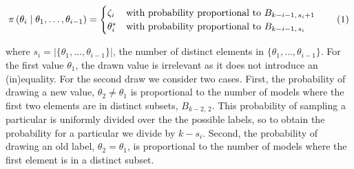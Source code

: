 \documentclass[11pt,a4paper]{article}
\theoremstyle{definition} %
\theoremstyle{case}
\newcommand{\prior}[1]{\pi\left({#1}\right)}
\newcommand{\rbellnum}[2]{B_{#1,\,#2}}
\newcommand{\setsize}[1]{|{#1}|}
\newcommand{\numberthis}{\addtocounter{equation}{1}\tag{\theequation}}
\begin{document}

\begin{equation}
    \prior{\theta_i \mid \theta_1, \ldots, \theta_{i - 1}} = \begin{cases}
    \zeta_i & \text{with probability proportional to } \rbellnum{k - i - 1}{s_i + 1} \\
    \theta_i^\ast & \text{with probability proportional to }  \rbellnum{k - i - 1}{s_i} \enspace
    \end{cases} \numberthis
\end{equation}


where $s_i = \setsize{\{\theta_1, \ldots, \theta_{i - 1}\}}$, the number of distinct elements in $\{\theta_1, \ldots, \theta_{i - 1}\}$. For the first value $\theta_1$, the drawn value is irrelevant as it does not introduce an (in)equality. For the second draw we consider two cases. First, the probability of drawing a new value, $\theta_2 \neq \theta_1$ is proportional to the number of models where the first two elements are in distinct subsets, $\rbellnum{k - 2}{2}$. This probability of sampling a particular  is uniformly divided over the the possible labels, so to obtain the probability for a particular we divide by $k - s_i$. Second, the probability of drawing an old label, $\theta_2 = \theta_1$, is proportional to the number of models where the first element is in a distinct subset.
\end{document}
